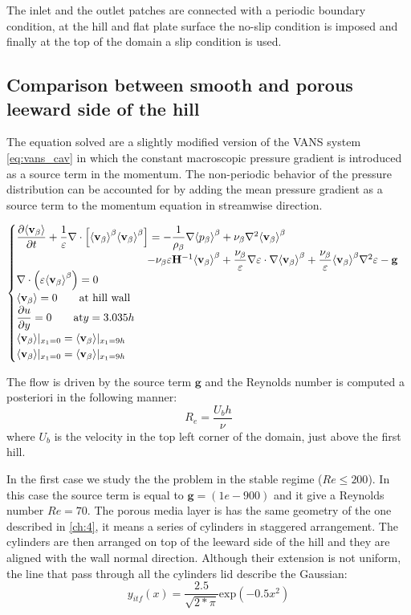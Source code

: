 The inlet and the outlet patches are connected with a periodic boundary condition, at the hill and flat plate surface the no-slip condition is imposed and finally at the top of the domain a slip condition is used.





\subsection{Comparison between smooth and porous leeward side of the hill}

The equation solved are a slightly modified version of the VANS system \eqref{eq:vans_cav} in which the constant macroscopic pressure gradient is introduced as a source term in the momentum.
The non-periodic behavior of the pressure distribution can be accounted for by adding the mean pressure gradient as a source term to the momentum equation in streamwise direction.

\begin{eqnarray}
\begin{cases}
\dfrac{\partial {\left< \textbf{v}_{\beta} \right>}}{\partial t} + \dfrac{1}{\varepsilon} \nabla \cdot \left[  {\left< \textbf{v}_{\beta} \right>}^{\beta}  {\left< \textbf{v}_{\beta} \right>}^{\beta} \right] = -\dfrac{1}{\rho_{\beta}} \nabla {\left< p_{\beta}\right>}^{\beta} + \nu_{\beta} \nabla^2 {\left< \textbf{v}_{\beta} \right>}^{\beta} \\ 
\qquad \qquad \qquad \qquad \qquad \qquad- \nu_{\beta} \varepsilon \mathbf{H}^{-1} {\left< \textbf{v}_{\beta} \right>}^{\beta} +\dfrac{\nu_{\beta}}{\varepsilon} \nabla \varepsilon \cdot \nabla {\left< \textbf{v}_{\beta} \right>}^{\beta} + \dfrac{\nu_{\beta}}{\varepsilon} {\left< \textbf{v}_{\beta} \right>}^{\beta} \nabla^2 \varepsilon - \mathbf{g}\\
\nabla \cdot \left(\varepsilon {\left< \textbf{v}_{\beta} \right>}^{\beta} \right) = 0\\
{\left< \textbf{v}_{\beta} \right>} = 0 \qquad \textrm{at hill wall} \\
\dfrac{\partial u}{\partial y}=0 \qquad \textrm{at} y = 3.035h\\
{\left< \textbf{v}_{\beta} \right>}|_{x_1 = 0} = {\left< \textbf{v}_{\beta} \right>}|_{x_1 = 9h} \\
{\left< \textbf{v}_{\beta} \right>}|_{x_1 = 0} = {\left< \textbf{v}_{\beta} \right>}|_{x_1 = 9h} 
\end{cases}
\end{eqnarray}

The flow is driven by the source term $\mathbf{g}$ and the Reynolds number is computed a posteriori in the following manner:
$$
R_e = \dfrac{U_b h}{\nu}
$$
where $U_b$ is the velocity in the top left corner of the domain, just above the first hill.

In the first case we study the the problem in the stable regime ($Re\leq200$). In this case the source term is equal to $\mathbf{g} = (1e-9 0 0)$ and it give a Reynolds number $Re=70$.
The porous media layer is has the same geometry of the one described in \ref{ch:4}, it means a series of cylinders in staggered arrangement. The cylinders are then arranged on top of the leeward side of the hill and they are aligned with the wall normal direction. Although their extension is not uniform, the line that pass through all the cylinders lid describe the Gaussian:
\begin{equation}
	y_{itf}(x) = \dfrac{2.5}{\sqrt{2*\pi}} \textrm{exp}\left( -0.5 x^2 \right)
	\label{eq:gaussian}
\end{equation}

